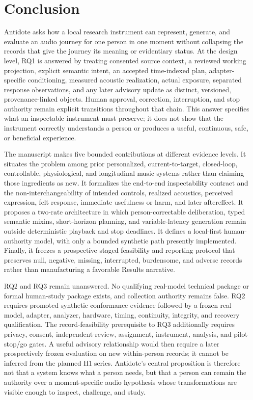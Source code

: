 \clearpage
\section{Conclusion}
\label{sec:conclusion}

Antidote asks how a local research instrument can represent, generate, and
evaluate an audio journey for one person in one moment without collapsing the
records that give the journey its meaning or evidentiary status. At the design
level, RQ1 is answered by treating consented source context, a reviewed working
projection, explicit semantic intent, an accepted time-indexed plan,
adapter-specific conditioning, measured acoustic realization, actual exposure,
separated response observations, and any later advisory update as distinct,
versioned, provenance-linked objects. Human approval, correction, interruption,
and stop authority remain explicit transitions throughout that chain. This
answer specifies what an inspectable instrument must preserve; it does not show
that the instrument correctly understands a person or produces a useful,
continuous, safe, or beneficial experience.

The manuscript makes five bounded contributions at different evidence levels.
It situates the problem among prior personalized, current-to-target,
closed-loop, controllable, physiological, and longitudinal music systems rather
than claiming those ingredients as new. It formalizes the end-to-end
inspectability contract and the non-interchangeability of intended controls,
realized acoustics, perceived expression, felt response, immediate usefulness
or harm, and later aftereffect. It proposes a two-rate architecture in which
person-correctable deliberation, typed semantic mixins, short-horizon planning,
and variable-latency generation remain outside deterministic playback and stop
deadlines. It defines a local-first human-authority model, with only a bounded
synthetic path presently implemented. Finally, it freezes a prospective staged
feasibility and reporting protocol that preserves null, negative, missing,
interrupted, burdensome, and adverse records rather than manufacturing a
favorable Results narrative.

RQ2 and RQ3 remain unanswered. No qualifying real-model technical package or
formal human-study package exists, and collection authority remains false. RQ2
requires promoted synthetic conformance evidence followed by a frozen
real-model, adapter, analyzer, hardware, timing, continuity, integrity, and
recovery qualification. The record-feasibility prerequisite to RQ3 additionally
requires privacy, consent, independent-review, assignment, instrument,
analysis, and pilot stop/go gates. A useful advisory relationship would then
require a later prospectively frozen evaluation on new within-person records;
it cannot be inferred from the planned H1 series. Antidote's central proposition
is therefore not that a system knows what a person needs, but that a person can
remain the authority over a moment-specific audio hypothesis whose
transformations are visible enough to inspect, challenge, and study.
